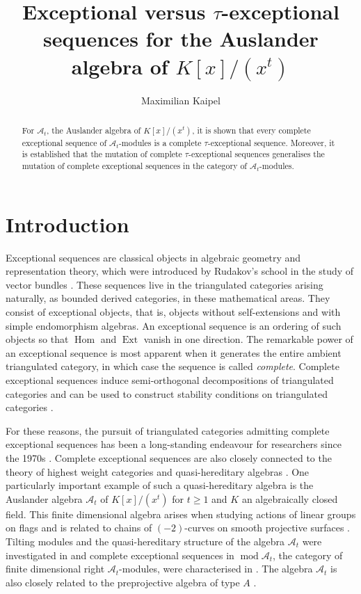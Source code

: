 \documentclass[10pt,twoside, a4paper,reqno]{amsart}
\title[Exceptional versus $\tau$-exceptional sequences]{Exceptional versus $\tau$-exceptional sequences for the Auslander algebra of $K[x]/(x^t)$}
\author[M. Kaipel]{Maximilian Kaipel}
\DeclareMathOperator{\mods}{mod}
\DeclareMathOperator{\Ext}{Ext}
\DeclareMathOperator{\Hom}{Hom}
\newcommand{\A}{\mathscr{A}}
\theoremstyle{definition}
\begin{document}
\begin{abstract}
	For $\A_t$, the Auslander algebra of $K[x]/(x^t)$, it is shown that every complete exceptional sequence of $\A_t$-modules is a complete $\tau$-exceptional sequence. Moreover, it is established that the mutation of complete $\tau$-exceptional sequences generalises the mutation of complete exceptional sequences in the category of $\A_t$-modules.
\end{abstract}

\maketitle


\section{Introduction}

Exceptional sequences are classical objects in algebraic geometry and representation theory, which were introduced by Rudakov's school in the study of vector bundles \cite{GorodentsevRudakov,Gorodentsev1988, Rudakov90}. These sequences live in the triangulated categories arising naturally, as bounded derived categories, in these mathematical areas. They consist of exceptional objects, that is, objects without self-extensions and with simple endomorphism algebras. An exceptional sequence is an ordering of such objects so that $\Hom$ and $\Ext$ vanish in one direction. The remarkable power of an exceptional sequence is most apparent when it generates the entire ambient triangulated category, in which case the sequence is called \textit{complete}. Complete exceptional sequences induce semi-orthogonal decompositions of triangulated categories \cite{Bondal1990} and can be used to construct stability conditions on triangulated categories \cite{Macri2007}.

For these reasons, the pursuit of triangulated categories admitting complete exceptional sequences has been a long-standing endeavour for researchers since the 1970s \cite{Beilinson1979,Kapranov1988, cbw92, Kawamata2006, PrabhuNaik2017, CHS2025}. Complete exceptional sequences are also closely connected to the theory of highest weight categories and quasi-hereditary algebras \cite{Krause2017}. One particularly important example of such a quasi-hereditary algebra is the Auslander algebra $\A_t$ of $K[x]/(x^t)$ for $t \geq 1$ and $K$ an algebraically closed field. This finite dimensional algebra arises when studying actions of linear groups on flags \cite[Sec. 4]{HilleRoehrle1999} and is related to chains of $(-2)$-curves on smooth projective surfaces \cite[Sec. 3.2]{HillePloog2019b}. Tilting modules and the quasi-hereditary structure of the algebra $\A_t$ were investigated in \cite{BHRR1999} and complete exceptional sequences in $\mods \A_t$, the category of finite dimensional right $\A_t$-modules, were characterised in \cite{HillePloog2019}. The algebra $\A_t$ is also closely related to the preprojective algebra of type $A$ \cite{RingelZhang2014}. 
\end{document}
